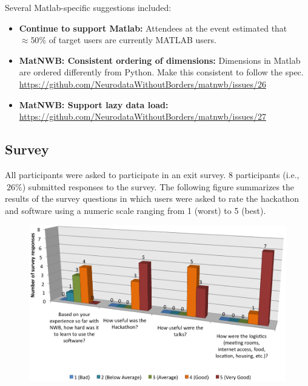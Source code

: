 \documentclass{article}
\begin{document}
\noindent Several Matlab-specific suggestions included:
\begin{itemize}
  \item \textbf{Continue to support Matlab:} Attendees at the event estimated that $\approx 50\%$ of target 
        users are currently MATLAB users.
  \item \textbf{MatNWB: Consistent ordering of dimensions:} Dimensions in Matlab are ordered
        differently from Python. Make this consistent to follow the spec. 
        {\scriptsize \href{https://github.com/NeurodataWithoutBorders/matnwb/issues/26}{https://github.com/NeurodataWithoutBorders/matnwb/issues/26} }
 \item \textbf{MatNWB: Support lazy data load:} {\footnotesize \href{https://github.com/NeurodataWithoutBorders/matnwb/issues/27}{https://github.com/NeurodataWithoutBorders/matnwb/issues/27}}

\end{itemize}

\subsection{Survey}

All participants were asked to participate in an exit survey. 8 participants (i.e., $~26\%$) submitted responses
to the survey. The following figure summarizes the results of the survey questions in which users were asked to
rate the hackathon and software using a numeric scale ranging from 1 (worst) to 5 (best). 

\begin{figure}[h!]
\includegraphics[width=15.5cm]{survey_chart.png}
\label{fig:survey}
\end{figure}

\clearpage
\end{document}
